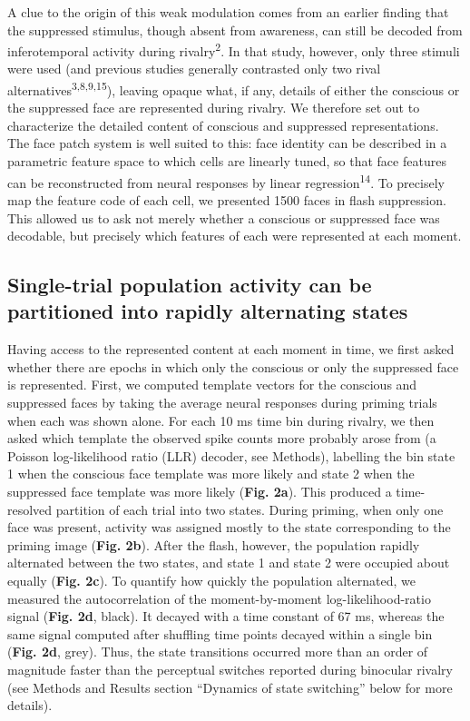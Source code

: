 \documentclass{article}
\begin{document}
A clue to the origin of this weak modulation comes from an earlier finding that the suppressed stimulus, though absent from awareness, can still be decoded from inferotemporal activity during rivalry\textsuperscript{2}. In that study, however, only three stimuli were used (and previous studies generally contrasted only two rival alternatives\textsuperscript{3,8,9,15}), leaving opaque what, if any, details of either the conscious or the suppressed face are represented during rivalry. We therefore set out to characterize the detailed content of conscious and suppressed representations. The face patch system is well suited to this: face identity can be described in a parametric feature space to which cells are linearly tuned, so that face features can be reconstructed from neural responses by linear regression\textsuperscript{14}. To precisely map the feature code of each cell, we presented 1500 faces in flash suppression. This allowed us to ask not merely whether a conscious or suppressed face was decodable, but precisely which features of each were represented at each moment.

\subsection*{Single-trial population activity can be partitioned into rapidly alternating states}

Having access to the represented content at each moment in time, we first asked whether there are epochs in which only the conscious or only the suppressed face is represented. First, we computed template vectors for the conscious and suppressed faces by taking the average neural responses during priming trials when each was shown alone. For each 10 ms time bin during rivalry, we then asked which template the observed spike counts more probably arose from (a Poisson log-likelihood ratio (LLR) decoder, see Methods), labelling the bin state 1 when the conscious face template was more likely and state 2 when the suppressed face template was more likely (\textbf{Fig. 2a}). This produced a time-resolved partition of each trial into two states. During priming, when only one face was present, activity was assigned mostly to the state corresponding to the priming image (\textbf{Fig. 2b}). After the flash, however, the population rapidly alternated between the two states, and state 1 and state 2 were occupied about equally (\textbf{Fig. 2c}). To quantify how quickly the population alternated, we measured the autocorrelation of the moment-by-moment log-likelihood-ratio signal (\textbf{Fig. 2d}, black). It decayed with a time constant of 67 ms, whereas the same signal computed after shuffling time points decayed within a single bin (\textbf{Fig. 2d}, grey). Thus, the state transitions occurred more than an order of magnitude faster than the perceptual switches reported during binocular rivalry (see Methods and Results section ``Dynamics of state switching'' below for more details).
\end{document}
